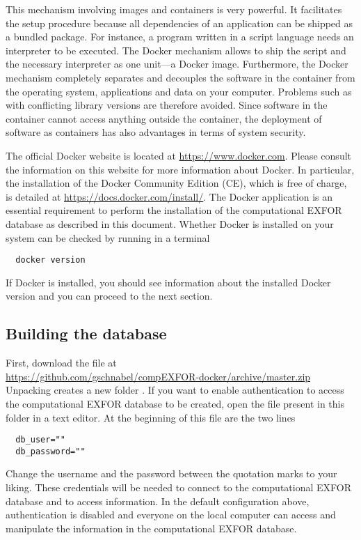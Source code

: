 \documentclass[12pt,a4paper]{scrartcl}
\begin{document}
This mechanism involving images and containers is very powerful.
It facilitates the setup procedure because all dependencies of an application can be shipped as a bundled package.
For instance, a program written in a script language needs an interpreter to be executed.
The Docker mechanism allows to ship the script and the necessary interpreter as one unit---a Docker image.
Furthermore, the Docker mechanism completely separates and decouples the software in the container from the operating system, applications and data on your computer.
Problems such as with conflicting library versions are therefore avoided.
Since software in the container cannot access anything outside the container, the deployment of software as containers has also advantages in terms of system security.

The official Docker website is located at \url{https://www.docker.com}.
Please consult the information on this website for more information about Docker.
In particular, the installation of the Docker Community Edition (CE), which is free of charge, is detailed at \url{https://docs.docker.com/install/}.
The Docker application is an essential requirement to perform the installation of the computational EXFOR database as described in this document.
Whether Docker is installed on your system can be checked by running in a terminal
\begin{verbatim}
  docker version
\end{verbatim}
If Docker is installed, you should see information about the installed Docker version and you can proceed to the next section.



 \subsection{Building the database}
 \label{subsec:build_db}
  
 First, download the file at
 \nopagebreak
 \\[2ex]
 \indent\url{https://github.com/gschnabel/compEXFOR-docker/archive/master.zip}
 \\[2ex]
 \noindent 
 Unpacking creates a new folder .
 If you want to enable authentication to access the computational EXFOR database to be created, open the file  present in this folder in a text editor. At the beginning of this file are the two lines
\begin{verbatim}
  db_user=""
  db_password=""
\end{verbatim}
Change the username and the password between the quotation marks to your liking.
These credentials will be needed to connect to the computational EXFOR database and to access information.
In the default configuration above, authentication is disabled and everyone on the local computer can access and manipulate the information in the computational EXFOR database.
\end{document}
